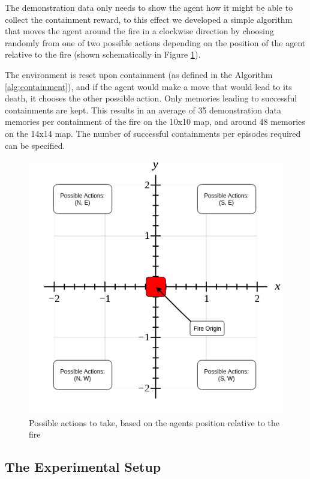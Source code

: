 The demonstration data only needs to show the agent how it might be able to collect the containment reward, to this effect we developed a simple algorithm that moves the agent around the fire in a clockwise direction by choosing randomly from one of two possible actions depending on the position of the agent relative to the fire (shown schematically in Figure \ref{fig:demodata}). 

The environment is reset upon containment (as defined in the Algorithm \ref{alg:containment}), and if the agent would make a move that would lead to its death, it chooses the other possible action. Only memories leading to successful containments are kept. This results in an average of 35 demonstration data memories per containment of the fire on the 10x10 map, and around 48 memories on the 14x14 map. The number of successful containments per episodes required can be specified.

\begin{figure}[h]
    \centering
    \includegraphics[width=1\linewidth]{img/Demo-data_Baseline.png}
    \caption{Possible actions to take, based on the agents position relative to the fire}
    \label{fig:demodata}
\end{figure}



\subsection{The Experimental Setup}\label{sec:experiment}

